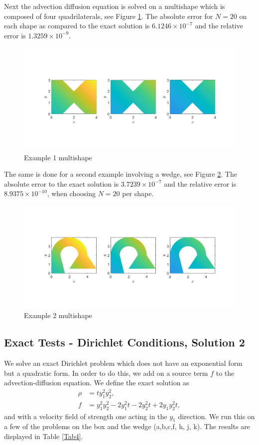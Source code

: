 \documentclass[11pt, a4paper]{article}
\theoremstyle{definition}
\begin{document}
Next the advection diffusion equation is solved on a multishape which is composed of four quadrilaterals, see Figure \ref{F6}. The absolute error for $N = 20$ on each shape as compared to the exact solution is $6.1246 \times 10^{-7}$ and the relative error is $1.3259 \times 10^{-9}$. 
\begin{figure}[h]
	\centering
	\includegraphics[scale=0.35]{example1.png}
	\caption{Example 1 multishape} 
	\label{F6}
\end{figure}
The same is done for a second example involving a wedge, see Figure \ref{F7}. The absolute error to the exact solution is $3.7239 \times 10^{-7}$ and the relative error is $8.9375 \times 10^{-10}$, when choosing $N= 20$ per shape. 

\begin{figure}[h]
	\centering
	\includegraphics[scale=0.35]{example2.png}
	\caption{Example 2 multishape} 
	\label{F7}
\end{figure}


\subsection{Exact Tests - Dirichlet Conditions, Solution 2}

We solve an exact Dirichlet problem which does not have an exponential form but a quadratic form. In order to do this, we add on a source term $f$ to the advection-diffusion equation.
We define the exact solution as
\begin{align*}
	\rho &= t y_1^2 y_2^2,\\
	f &= y_1^2 y_2^2 - 2 y_1^2 t - 2 y_2^2 t + 2 y_1 y_2^2 t,
\end{align*}
and with a velocity field of strength one acting in the $y_1$ direction.
We run this on a few of the problems on the box and the wedge (a,b,c,f, h, j, k). The results are displayed in Table \ref{Tab4}.
\end{document}
